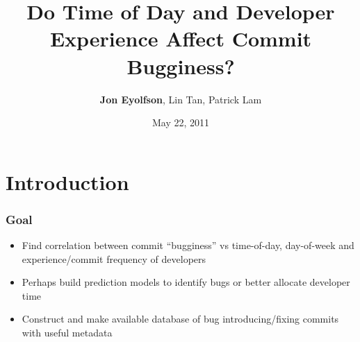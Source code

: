 \documentclass[aspectratio=43]{beamer}
\title{Do Time of Day and Developer Experience Affect Commit Bugginess?}
\author{{\bfseries Jon Eyolfson}, Lin Tan, Patrick Lam}
\institute{University of Waterloo}
\date{May 22, 2011}
\begin{document}
\begin{frame}[plain]
\titlepage
\end{frame}


\section{Introduction}
\begin{frame}
  \frametitle{Goal}
  
  \begin{itemize}

    \item Find correlation between commit ``bugginess'' vs time-of-day,
          day-of-week and experience/commit frequency of developers

    \vspace{2em}

    \item Perhaps build prediction models to identify bugs or better allocate
          developer time

    \vspace{2em}

    \item Construct and make available database of bug introducing/fixing
          commits with useful metadata

  \end{itemize}
\end{frame}
\end{document}
